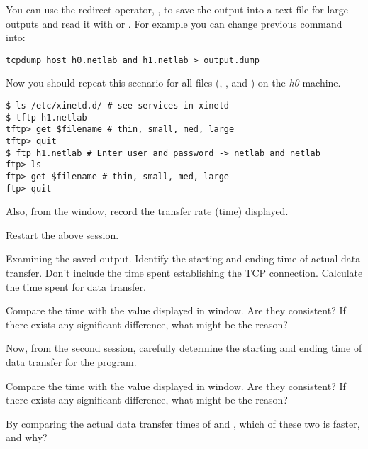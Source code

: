 \documentclass{../UTNetLab}
\begin{document}
You can use the redirect operator, \lstbash{>}, to save the  output into a text file for large  outputs and read it with  or .
For example you can change previous command into:
\begin{lstlisting}[emph={h0,h1,netlab,output,dump},morekeywords={[3]host,and}]
tcpdump host h0.netlab and h1.netlab > output.dump
    \end{lstlisting}

Now you should repeat this scenario for all files (, ,  and ) on the \textit{h0} machine.
\begin{lstlisting}[emph={h1,netlab},morekeywords={[2]get,quit}]
$ ls /etc/xinetd.d/ # see services in xinetd
$ tftp h1.netlab
tftp> get $filename # thin, small, med, large
tftp> quit
$ ftp h1.netlab # Enter user and password -> netlab and netlab
ftp> ls
ftp> get $filename # thin, small, med, large
ftp> quit
    \end{lstlisting}

Also, from the  window, record the transfer rate (time) displayed.

Restart the above  session.

\begin{report}
    \item Examining the saved  output.
    Identify the starting and ending time of actual data transfer.
    Don’t include the time spent establishing the TCP connection.
    Calculate the time spent for data transfer.

    \item Compare the time with the value displayed in  window.
    Are they consistent?
    If there exists any significant difference, what might be the reason?

    \item Now, from the second session, carefully determine the starting and ending time of data transfer for the  program.

    \item Compare the time with the value displayed in  window.
    Are they consistent?
    If there exists any significant difference, what might be the reason?

    \item By comparing the actual data transfer times of  and , which of these two is faster, and why?
\end{report}
\end{document}
